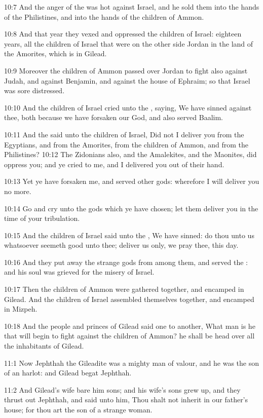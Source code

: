 10:7 And the anger of the \LORD was hot against Israel, and he sold them into the hands of the Philistines, and into the hands of the children of Ammon.

10:8 And that year they vexed and oppressed the children of Israel: eighteen years, all the children of Israel that were on the other side Jordan in the land of the Amorites, which is in Gilead.

10:9 Moreover the children of Ammon passed over Jordan to fight also against Judah, and against Benjamin, and against the house of Ephraim; so that Israel was sore distressed.

10:10 And the children of Israel cried unto the \LORD, saying, We have sinned against thee, both because we have forsaken our God, and also served Baalim.

10:11 And the \LORD said unto the children of Israel, Did not I deliver you from the Egyptians, and from the Amorites, from the children of Ammon, and from the Philistines?  10:12 The Zidonians also, and the Amalekites, and the Maonites, did oppress you; and ye cried to me, and I delivered you out of their hand.

10:13 Yet ye have forsaken me, and served other gods: wherefore I will deliver you no more.

10:14 Go and cry unto the gods which ye have chosen; let them deliver you in the time of your tribulation.

10:15 And the children of Israel said unto the \LORD, We have sinned: do thou unto us whatsoever seemeth good unto thee; deliver us only, we pray thee, this day.

10:16 And they put away the strange gods from among them, and served the \LORD: and his soul was grieved for the misery of Israel.

10:17 Then the children of Ammon were gathered together, and encamped in Gilead. And the children of Israel assembled themselves together, and encamped in Mizpeh.

10:18 And the people and princes of Gilead said one to another, What man is he that will begin to fight against the children of Ammon? he shall be head over all the inhabitants of Gilead.

11:1 Now Jephthah the Gileadite was a mighty man of valour, and he was the son of an harlot: and Gilead begat Jephthah.

11:2 And Gilead's wife bare him sons; and his wife's sons grew up, and they thrust out Jephthah, and said unto him, Thou shalt not inherit in our father's house; for thou art the son of a strange woman.

